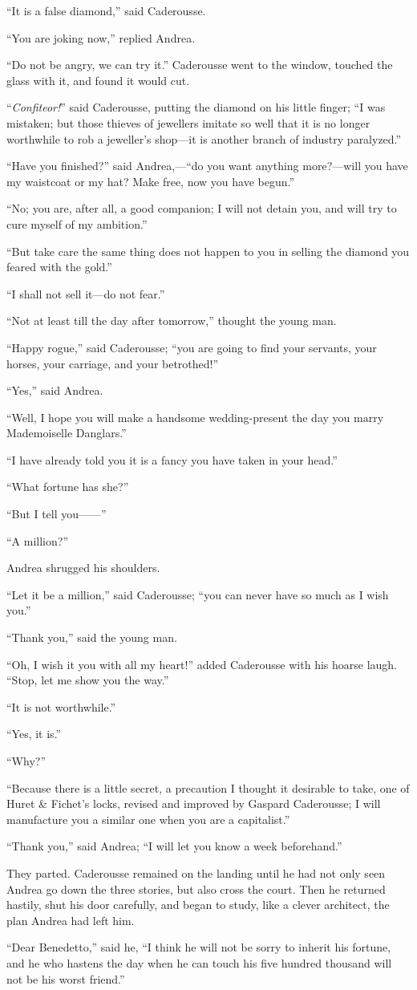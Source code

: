 “It is a false diamond,” said Caderousse.

“You are joking now,” replied Andrea.

“Do not be angry, we can try it.” Caderousse went to the window,
touched the glass with it, and found it would cut.

“\textit{Confiteor!}” said Caderousse, putting the diamond on his little
finger; “I was mistaken; but those thieves of jewellers imitate so well
that it is no longer worthwhile to rob a jeweller’s shop—it is another
branch of industry paralyzed.”

“Have you finished?” said Andrea,—“do you want anything more?—will you
have my waistcoat or my hat? Make free, now you have begun.”

“No; you are, after all, a good companion; I will not detain you, and
will try to cure myself of my ambition.”

“But take care the same thing does not happen to you in selling the
diamond you feared with the gold.”

“I shall not sell it—do not fear.”

“Not at least till the day after tomorrow,” thought the young man.

“Happy rogue,” said Caderousse; “you are going to find your servants,
your horses, your carriage, and your betrothed!”

“Yes,” said Andrea.

“Well, I hope you will make a handsome wedding-present the day you
marry Mademoiselle Danglars.”

“I have already told you it is a fancy you have taken in your head.”

“What fortune has she?”

“But I tell you——”

“A million?”

Andrea shrugged his shoulders.

“Let it be a million,” said Caderousse; “you can never have so much as
I wish you.”

“Thank you,” said the young man.

“Oh, I wish it you with all my heart!” added Caderousse with his hoarse
laugh. “Stop, let me show you the way.”

“It is not worthwhile.”

“Yes, it is.”

“Why?”

“Because there is a little secret, a precaution I thought it desirable
to take, one of Huret \& Fichet’s locks, revised and improved by Gaspard
Caderousse; I will manufacture you a similar one when you are a
capitalist.”

“Thank you,” said Andrea; “I will let you know a week beforehand.”

They parted. Caderousse remained on the landing until he had not only
seen Andrea go down the three stories, but also cross the court. Then
he returned hastily, shut his door carefully, and began to study, like
a clever architect, the plan Andrea had left him.

“Dear Benedetto,” said he, “I think he will not be sorry to inherit his
fortune, and he who hastens the day when he can touch his five hundred
thousand will not be his worst friend.”
